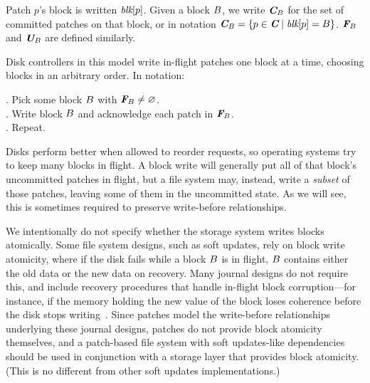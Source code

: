 \documentclass[9pt,twocolumn,letterpaper]{article}
\begin{document}
Patch $p$'s block is written $\textit{blk}[{p}]$.
%
Given a block $B$, we write $\PDisk[\PB]$ for the set of committed
 patches on that block, or in notation $\PDisk[\PB] = \{p\in\PDisk\mid\PBlock{p}=\PB\}$.
%
$\PInf[\PB]$ and $\PMem[\PB]$ are defined similarly.


Disk controllers in this model write in-flight patches one block at a time,
 choosing blocks in an arbitrary order. In notation:
%
\begin{tabbing}
\qquad {}. Pick some block $B$ with $\PInf[\PB] \neq \emptyset$. \\
\qquad {}. Write block $B$ and acknowledge each patch in $\PInf[\PB]$. \\
\qquad {}. Repeat.
\end{tabbing}
%
\noindent
%
Disks perform better when allowed to reorder requests, so operating systems
 try to keep many blocks in flight.
%
%
A block write will generally put all of that block's uncommitted
 patches in flight, but a file system may, instead, write a \emph{subset} of those
 patches, leaving some of them in the uncommitted state.
%
As we will see, this is sometimes
 required to preserve write-before relationships.


We intentionally do not specify whether the storage system writes blocks
 atomically.
%
Some file system designs, such as soft updates, rely on block write
 atomicity, where
%
if the disk fails while a block $B$ is
 in flight, $B$ contains either the old data or the new data on recovery.
%
Many journal designs do not require this, and include recovery procedures
 that handle in-flight block corruption---for instance, if the memory
 holding the new value of the block loses coherence before the disk stops
 writing~\cite{tso04ext3}.
%
Since patches model the write-before relationships underlying these
 journal designs, patches do not provide block atomicity themselves, and
%
a patch-based file system with soft updates-like dependencies
 should be used in conjunction with a storage layer that provides block
 atomicity.  (This is no different from other soft updates
 implementations.)
\end{document}
